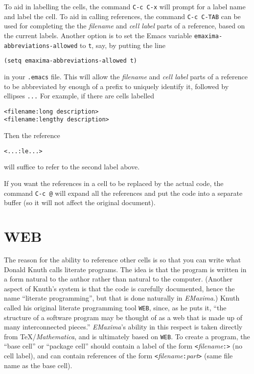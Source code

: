 \documentclass{article}
\newcommand{\emx}{\textsl{\sffamily EMaxima}}
\begin{document}
To aid in labelling the cells, the command \texttt{C-c C-x}
will prompt for a label name and label the
cell.  To aid in calling references, the command \texttt{C-c C-TAB}
can be used for completing the
the \textsl{filename} and \textsl{cell label} parts of a reference, 
based on the current labels.  
Another option is to set the Emacs variable
\texttt{emaxima-abbreviations-allowed} to \texttt{t}, say, by putting
the line
\begin{verbatim}
(setq emaxima-abbreviations-allowed t)
\end{verbatim}
\noindent
in your \texttt{.emacs} file.  This will allow the \textsl{filename}
and \textsl{cell label} parts of a reference to be abbreviated by enough
of a prefix to uniquely identify it, followed by ellipses
\texttt{...}
For example, if there are cells labelled
\begin{verbatim}
<filename:long description>
<filename:lengthy description>
\end{verbatim}
\noindent
Then the reference
\begin{verbatim}
<...:le...>
\end{verbatim}
\noindent
will suffice to refer to the second label above.

If you want the references in a cell to be replaced by the actual
code, the command \texttt{C-c @} will expand all the
references and put the code into a separate buffer (so it will not
affect the original document).

\section{WEB}

\noindent
The reason for the ability to reference other cells is so that you can
write what Donald Knuth calls literate programs.  The idea is that the
program is written in a form natural to the author rather than natural
to the computer.  (Another aspect of Knuth's system is that the code
is carefully documented, hence the name ``literate programming'', but
that is done naturally in \emx{}.)  Knuth called his original
literate programming tool \texttt{WEB}, since, as he puts it,
``the structure of a software program may be thought of as a web that
is made up of many interconnected pieces.''  
\emx{}'s ability in this respect is taken directly from
\TeX{}/\textit{Mathematica}, and is ultimately based on
\texttt{WEB}. To create a 
program, the ``base cell'' or ``package cell'' should contain 
a label of the form \texttt{<}\textsl{filename}\texttt{:>} 
(no cell label), and can
contain references of the form 
\texttt{<}\textsl{filename}\texttt{:}\textsl{part}\texttt{>}
(same file name as the base cell).  
\end{document}
